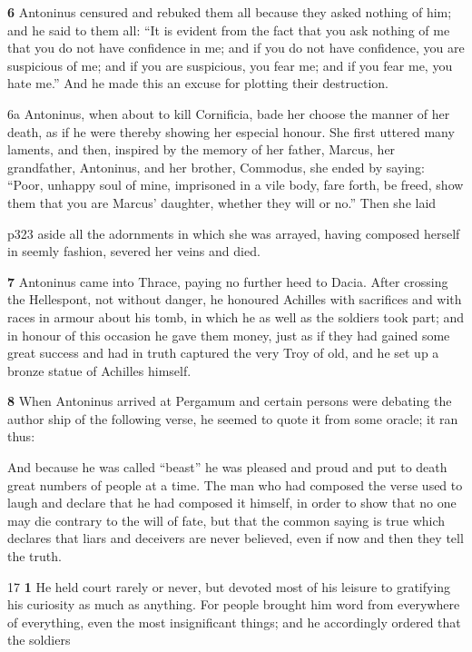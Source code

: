 \textbf{6} Antoninus censured and rebuked them all because they asked nothing of him; and he said to them all: ``It is evident from the fact that you ask nothing of me that you do not have confidence in me; and if you do not have confidence, you are suspicious of me; and if you are suspicious, you fear me; and if you fear me, you hate me.'' And he made this an excuse for plotting their destruction.

6a Antoninus, when about to kill Cornificia, bade her choose the manner of her death, as if he were thereby showing her especial honour. She first uttered many laments, and then, inspired by the memory of her father, Marcus, her grandfather, Antoninus, and her brother, Commodus, she ended by saying: ``Poor, unhappy soul of mine, imprisoned in a vile body, fare forth, be freed, show them that you are Marcus' daughter, whether they will or no.'' Then she laid

p323 aside all the adornments in which she was arrayed, having composed herself in seemly fashion, severed her veins and died.

\textbf{7} Antoninus came into Thrace, paying no further heed to Dacia. After crossing the Hellespont, not without danger, he honoured Achilles with sacrifices and with races in armour about his tomb, in which he as well as the soldiers took part; and in honour of this occasion he gave them money, just as if they had gained some great success and had in truth captured the very Troy of old, and he set up a bronze statue of Achilles himself.

\textbf{8} When Antoninus arrived at Pergamum and certain persons were debating the author ­ship of the following verse, he seemed to quote it from some oracle; it ran thus:

And because he was called ``beast'' he was pleased and proud and put to death great numbers of people at a time. The man who had composed the verse used to laugh and declare that he had composed it himself, in order to show that no one may die contrary to the will of fate, but that the common saying is true which declares that liars and deceivers are never believed, even if now and then they tell the truth.

17
\textbf{1} He held court rarely or never, but devoted most of his leisure to gratifying his curiosity as much as anything. For people brought him word from everywhere of everything, even the most insignificant things; and he accordingly ordered that the soldiers

